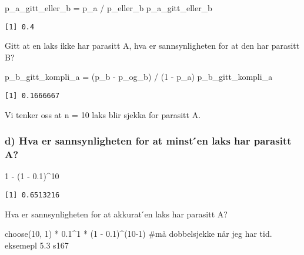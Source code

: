 \documentclass[
  12pt,
  a4paper,
  DIV=11,
  numbers=noendperiod]{scrartcl}
\newenvironment{Shaded}{\begin{snugshade}}{\end{snugshade}}
\newcommand{\CommentTok}[1]{\textcolor[rgb]{0.37,0.37,0.37}{#1}}
\newcommand{\DecValTok}[1]{\textcolor[rgb]{0.68,0.00,0.00}{#1}}
\newcommand{\FloatTok}[1]{\textcolor[rgb]{0.68,0.00,0.00}{#1}}
\newcommand{\FunctionTok}[1]{\textcolor[rgb]{0.28,0.35,0.67}{#1}}
\newcommand{\NormalTok}[1]{\textcolor[rgb]{0.00,0.23,0.31}{#1}}
\newcommand{\OtherTok}[1]{\textcolor[rgb]{0.00,0.23,0.31}{#1}}
\newcommand{\SpecialCharTok}[1]{\textcolor[rgb]{0.37,0.37,0.37}{#1}}
\begin{document}
\begin{Shaded}
\begin{Highlighting}[]
\NormalTok{p\_a\_gitt\_eller\_b }\OtherTok{=}\NormalTok{ p\_a }\SpecialCharTok{/}\NormalTok{ p\_eller\_b}
\NormalTok{p\_a\_gitt\_eller\_b}
\end{Highlighting}
\end{Shaded}

\begin{verbatim}
[1] 0.4
\end{verbatim}

Gitt at en laks ikke har parasitt A, hva er sannsynligheten for at den
har parasitt B?

\begin{Shaded}
\begin{Highlighting}[]
\NormalTok{p\_b\_gitt\_kompli\_a }\OtherTok{=}\NormalTok{ (p\_b }\SpecialCharTok{{-}}\NormalTok{ p\_og\_b) }\SpecialCharTok{/}\NormalTok{ (}\DecValTok{1} \SpecialCharTok{{-}}\NormalTok{ p\_a)}
\NormalTok{p\_b\_gitt\_kompli\_a}
\end{Highlighting}
\end{Shaded}

\begin{verbatim}
[1] 0.1666667
\end{verbatim}

Vi tenker oss at n = 10 laks blir sjekka for parasitt A.

\subsubsection{d) Hva er sannsynligheten for at minst ́en laks har
parasitt
A?}\label{d-hva-er-sannsynligheten-for-at-minst-en-laks-har-parasitt-a}

\begin{Shaded}
\begin{Highlighting}[]
\DecValTok{1} \SpecialCharTok{{-}}\NormalTok{ (}\DecValTok{1} \SpecialCharTok{{-}} \FloatTok{0.1}\NormalTok{)}\SpecialCharTok{\^{}}\DecValTok{10}
\end{Highlighting}
\end{Shaded}

\begin{verbatim}
[1] 0.6513216
\end{verbatim}

Hva er sannsynligheten for at akkurat ́en laks har parasitt A?

\begin{Shaded}
\begin{Highlighting}[]
\FunctionTok{choose}\NormalTok{(}\DecValTok{10}\NormalTok{, }\DecValTok{1}\NormalTok{) }\SpecialCharTok{*} \FloatTok{0.1}\SpecialCharTok{\^{}}\DecValTok{1} \SpecialCharTok{*}\NormalTok{ (}\DecValTok{1} \SpecialCharTok{{-}} \FloatTok{0.1}\NormalTok{)}\SpecialCharTok{\^{}}\NormalTok{(}\DecValTok{10{-}1}\NormalTok{) }\CommentTok{\#må dobbelsjekke når jeg har tid. eksemepl 5.3 s167}
\end{Highlighting}
\end{Shaded}
\end{document}
